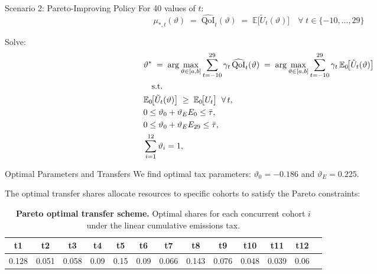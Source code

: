 \documentclass[aspectratio=1610]{beamer}
\begin{document}
\begin{frame}{Scenario 2: Pareto-Improving Policy}
For 40 values of $t$:
\begin{equation}
    \mu_{*,t}(\vartheta) \;=\; \widehat{\mathrm{QoI}}_t(\vartheta)
  \;=\;
  \mathbb{E}\!\bigl[\tilde{U}_t(\vartheta)\bigr] \quad \forall \; t \in \{-10,...,29\}
\end{equation}

Solve:
\begin{equation}
\label{eq:opt_pareto_y2}
\begin{aligned}
  &\vartheta^{\ast}
  \;=\;
  \arg\max_{\vartheta\in[a,b]}
  \sum_{t=-10}^{29}\gamma_t\, \widehat{\mathrm{QoI}}_t(\vartheta)
  \;=\;
  \arg\max_{\vartheta\in[a,b]} 
  \sum_{t=-10}^{29}\gamma_t\,\mathbb{E}_0\!\bigl[\tilde{U}_t(\vartheta)\bigr] \\
& \quad \text{s.t.} \\ 
& \mathbb{E}_0\!\bigl[\tilde{U}_t(\vartheta)\bigr]
  \;\ge\;
  \mathbb{E}_0\!\bigl[U_t\bigr]
  \;\;\forall\,t, \\
& 0 \leq \vartheta_0 + \vartheta_E  E_0 \leq \Bar{\tau}, \\
& 0 \leq \vartheta_0 + \vartheta_E  E_{29} \leq \Bar{\tau},  \\
& \sum_{i=1}^{12} \vartheta_i = 1,
\end{aligned}
\end{equation}
\end{frame}

\begin{frame}{Optimal Parameters and Transfers}
We find optimal tax parameters: $\vartheta_0 = -0.186$ and $\vartheta_E = 0.225$.\newline

The optimal transfer shares allocate resources to specific cohorts to satisfy the Pareto constraints:

\begin{table}[htbp]
\begin{small}
        \centering
    \begin{tabular}{|c|c|c|c|c|c|c|c|c|c|c|c|c|}
        \hline
        \textbf{t1} & \textbf{t2} & \textbf{t3} & \textbf{t4} & \textbf{t5} & \textbf{t6} & \textbf{t7} & \textbf{t8} & \textbf{t9} & \textbf{t10} & \textbf{t11} & \textbf{t12} \\
        \hline
        0.128 & 0.051 & 0.058 & 0.09 & 0.15 & 0.09 & 0.066 & 0.143 & 0.076 & 0.048 & 0.039 & 0.06 \\
        \hline
    \end{tabular}
    \caption{\textbf{Pareto optimal transfer scheme.} Optimal shares for each concurrent cohort $i$ under the linear cumulative emissions tax.}
    \label{tab:optimal_transfer_lin_S}
    \end{small}
\end{table}
\end{frame}
\end{document}

